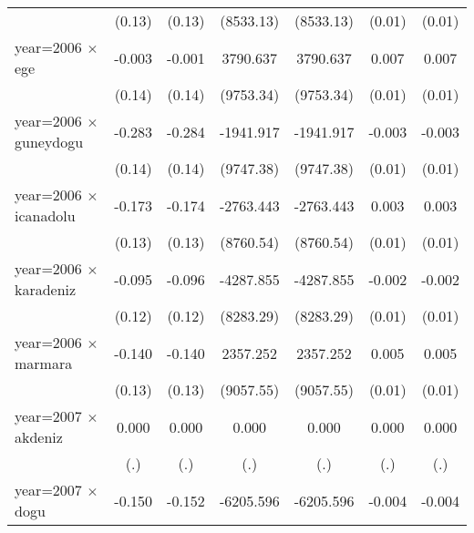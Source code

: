 {\begin{tabular}{l*{6}{c}}
                    &      (0.13)         &      (0.13)         &   (8533.13)         &   (8533.13)         &      (0.01)         &      (0.01)         \\
year=2006 $\times$ ege&      -0.003         &      -0.001         &    3790.637         &    3790.637         &       0.007         &       0.007         \\
                    &      (0.14)         &      (0.14)         &   (9753.34)         &   (9753.34)         &      (0.01)         &      (0.01)         \\
year=2006 $\times$ guneydogu&      -0.283\sym{*}  &      -0.284\sym{*}  &   -1941.917         &   -1941.917         &      -0.003         &      -0.003         \\
                    &      (0.14)         &      (0.14)         &   (9747.38)         &   (9747.38)         &      (0.01)         &      (0.01)         \\
year=2006 $\times$ icanadolu&      -0.173         &      -0.174         &   -2763.443         &   -2763.443         &       0.003         &       0.003         \\
                    &      (0.13)         &      (0.13)         &   (8760.54)         &   (8760.54)         &      (0.01)         &      (0.01)         \\
year=2006 $\times$ karadeniz&      -0.095         &      -0.096         &   -4287.855         &   -4287.855         &      -0.002         &      -0.002         \\
                    &      (0.12)         &      (0.12)         &   (8283.29)         &   (8283.29)         &      (0.01)         &      (0.01)         \\
year=2006 $\times$ marmara&      -0.140         &      -0.140         &    2357.252         &    2357.252         &       0.005         &       0.005         \\
                    &      (0.13)         &      (0.13)         &   (9057.55)         &   (9057.55)         &      (0.01)         &      (0.01)         \\
year=2007 $\times$ akdeniz&       0.000         &       0.000         &       0.000         &       0.000         &       0.000         &       0.000         \\
                    &         (.)         &         (.)         &         (.)         &         (.)         &         (.)         &         (.)         \\
year=2007 $\times$ dogu&      -0.150         &      -0.152         &   -6205.596         &   -6205.596         &      -0.004         &      -0.004         \\

\end{tabular}}
